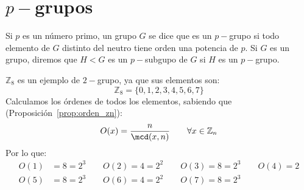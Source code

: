 \section{$p-$grupos}
\begin{definicion}[$p-$grupo]
    Si $p$ es un número primo, un grupo $G$ se dice que es un $p-$grupo si todo elemento de $G$ distinto del neutro tiene orden una potencia de $p$.\newline
    Si $G$ es un grupo, diremos que $H<G$ es un $p-$subgupo de $G$ si $H$ es un $p-$grupo.
\end{definicion}

\begin{ejemplo}
    $\mathbb{Z}_8$ es un ejemplo de $2-$grupo, ya que sus elementos son:
    \begin{equation*}
        \mathbb{Z}_8 = \{0, 1, 2, 3, 4, 5, 6, 7\}
    \end{equation*}
    Calculamos los órdenes de todos los elementos,  sabiendo que (Proposición~\ref{prop:orden_zn}):
    \begin{equation*}
        O(x) = \dfrac{n}{\mcd(x,n)} \qquad \forall x\in \mathbb{Z}_n
    \end{equation*}
    Por lo que:
    \begin{align*}
        O(1) &= 8 = 2^{3} \qquad 
        O(2) = 4 = 2^2 \qquad 
        O(3) = 8 = 2^3 \qquad 
        O(4) = 2 \\
        O(5) &= 8 = 2^3 \qquad 
        O(6) = 4 = 2^2 \qquad 
        O(7) = 8 = 2^3
    \end{align*}
\end{ejemplo}

